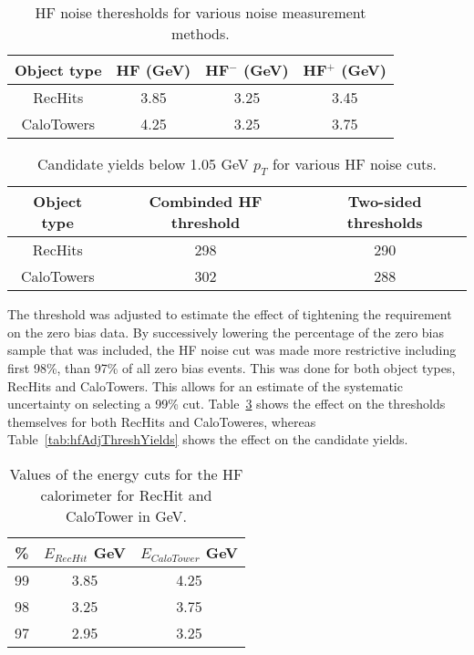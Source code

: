       \begin{table}[!Hhbt]
        \centering
        \begin{tabular}{|c|c|c|c|}
          \hline
          Object type & HF (GeV) & HF$^{-}$ (GeV) & HF$^{+}$ (GeV) \\ \hline
          RecHits & 3.85 & 3.25 & 3.45 \\ \hline
          CaloTowers & 4.25 & 3.25 & 3.75 \\ \hline
        \end{tabular}
        \caption{HF noise theresholds for various noise measurement methods.}
        \label{tab:hfNoiseThreshAsym}
      \end{table}

      \begin{table}[!Hhbt]
        \centering
        \begin{tabular}{|c|c|c|}
          \hline
          Object type & Combinded HF threshold & Two-sided thresholds \\ \hline
          RecHits & 298 & 290 \\ \hline
          CaloTowers & 302 & 288 \\ \hline
        \end{tabular}
        \caption{Candidate yields below 1.05 GeV $p_{T}$ for various HF noise
          cuts.}
        \label{tab:hfCutYieldEffects}
      \end{table}

      The threshold was adjusted to estimate the effect of tightening the
        requirement on the zero bias data.
      By successively lowering the percentage of the zero bias sample
        that was included, the HF noise cut was made more restrictive including
        first 98\%, than 97\% of all zero bias events. 
      This was done for both object types, RecHits and CaloTowers.
      This allows for an estimate of the systematic uncertainty on selecting 
        a 99\% cut.
      Table~\ref{tab:hfAdjustedThresholds} shows the effect on the thresholds
        themselves for both RecHits and CaloToweres, whereas 
        Table~\ref{tab:hfAdjThreshYields} shows the effect on the candidate 
        yields.

      \begin{table}[!Hhbt]
        \begin{center}
          \caption{Values of the energy cuts for the HF calorimeter for RecHit and CaloTower in GeV.}
          \label{tab:hfAdjustedThresholds}
          \begin{tabular}{|c|c|c|} \hline
            \% &  $E_{RecHit}$ GeV & $E_{CaloTower}$ GeV\\ 
            \hline
            99 & 3.85& 4.25 \\ \hline
            98 & 3.25& 3.75 \\ \hline
            97 & 2.95& 3.25 \\  \hline
           \end{tabular}
         \end{center}
      \end{table}

